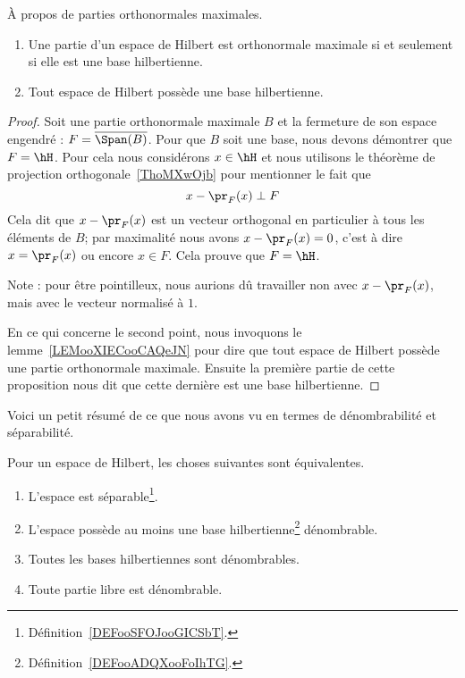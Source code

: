 \begin{proposition}      \label{PROPooLDXFooRaxBsI}
    À propos de parties orthonormales maximales.
    \begin{enumerate}
        \item
            Une partie d'un espace de Hilbert est orthonormale maximale si et seulement si elle est une base hilbertienne.
        \item       \label{ITEMooZFENooQnSlrv}
            Tout espace de Hilbert possède une base hilbertienne.
    \end{enumerate}
\end{proposition}

\begin{proof}
    Soit une partie orthonormale maximale \( B\) et la fermeture de son espace engendré : \( F=\overline{ \Span(B) }\). Pour que \( B\) soit une base, nous devons démontrer que \( F=\hH\). Pour cela nous considérons \( x\in \hH\) et nous utilisons le théorème de projection orthogonale~\ref{ThoMXwOjb} pour mentionner le fait que
    \begin{equation}
        x-\pr_F(x)\perp F
    \end{equation}
    Cela dit que \( x-\pr_F(x)\) est un vecteur orthogonal en particulier à tous les éléments de \( B\); par maximalité nous avons \( x-\pr_F(x)=0\), c'est à dire \( x=\pr_F(x)\) ou encore \( x\in F\). Cela prouve que \( F=\hH\).

    Note : pour être pointilleux, nous aurions dû travailler non avec \( x-\pr_F(x)\), mais avec le vecteur normalisé à \( 1\).

    En ce qui concerne le second point, nous invoquons le lemme~\ref{LEMooXIECooCAQeJN} pour dire que tout espace de Hilbert possède une partie orthonormale maximale. Ensuite la première partie de cette proposition nous dit que cette dernière est une base hilbertienne.
\end{proof}

Voici un petit résumé de ce que nous avons vu en termes de dénombrabilité et séparabilité.
\begin{theorem}     \label{THOooMKNFooVrCNGA}
    Pour un espace de Hilbert, les choses suivantes sont équivalentes.
    \begin{enumerate}
        \item       \label{ITEMooSJKVooFIIbwg}
            L'espace est séparable\footnote{Définition~\ref{DEFooSFOJooGICSbT}.}.
        \item       \label{ITEMooQIZLooYdtYqF}
            L'espace possède au moins une base hilbertienne\footnote{Définition~\ref{DEFooADQXooFoIhTG}.} dénombrable.
        \item       \label{ITEMooHYSXooOubwUy}
            Toutes les bases hilbertiennes sont dénombrables.
        \item       \label{ITEMooMZICooNBAVum}
            Toute partie libre est dénombrable.
    \end{enumerate}
\end{theorem}

